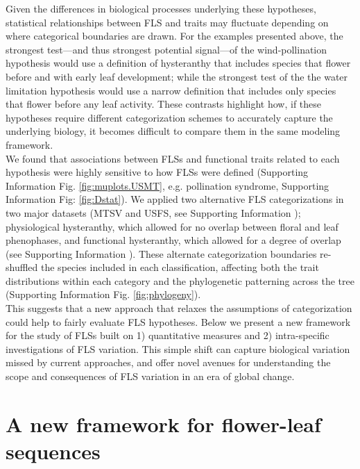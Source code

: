 \documentclass[11pt]{article}
\begin{document}
\noindent Given the differences in biological processes underlying these hypotheses, statistical relationships between FLS and traits may fluctuate depending on where categorical boundaries are drawn. For the examples presented above, the strongest test---and thus strongest potential signal---of the wind-pollination hypothesis would use a definition of hysteranthy that includes species that flower before and with early leaf development; while the strongest test of the the water limitation  hypothesis would use a narrow definition that includes only species that flower before any leaf activity. These contrasts highlight how, if these hypotheses require different categorization schemes to accurately capture the underlying biology, it becomes difficult to compare them in the same modeling framework.\\ %

\noindent We found that associations between FLSs and functional traits related to each hypothesis were highly sensitive to how FLSs were defined (Supporting Information Fig. \ref{fig:muplots.USMT}, e.g. pollination syndrome, Supporting Information Fig: \ref{fig:Dstat}). We applied two alternative FLS categorizations in two major datasets (MTSV and USFS, see Supporting Information ); physiological hysteranthy, which allowed for no overlap between floral and leaf phenophases, and functional hysteranthy, which allowed for a degree of overlap (see Supporting Information ). These alternate categorization boundaries re-shuffled the species included in each classification, affecting both the trait distributions within each category and the phylogenetic patterning across the tree (Supporting Information Fig. \ref{fig:phylogeny}).\\ 
 
\noindent This suggests that a new approach that relaxes the assumptions of categorization could help to fairly evaluate FLS hypotheses. Below we present a new framework for the study of FLSs built on 1) quantitative measures and 2) intra-specific investigations of FLS variation. This simple shift can capture biological variation missed by current approaches, and offer novel avenues for understanding the scope and consequences of FLS variation in an era of global change.

 
\section*{A new framework for flower-leaf sequences} 
\end{document}
